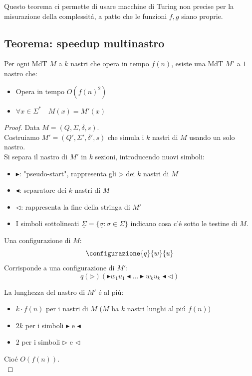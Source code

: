 Questo teorema ci permette di usare macchine di Turing non precise per la misurazione della complessitá, a patto che le funzioni $f, g$ siano proprie.


\subsection{Teorema: speedup multinastro}
Per ogni MdT $M$ a $k$ nastri che opera in tempo $f(n)$, esiste una MdT $M'$ a $1$ nastro che: 
\begin{itemize} 
	\item Opera in tempo $O(f(n)^2)$ 
	\item $\forall x \in \Sigma^* \quad M(x) = M'(x)$ 
\end{itemize}
\begin{proof}
Data $M = (Q, \Sigma, \delta, s)$. \\
Costruiamo $M' = (Q', \Sigma', \delta', s)$ che simula i $k$ nastri di $M$ usando un solo nastro. \\
Si separa il nastro di $M'$ in $k$ sezioni, introducendo nuovi simboli: 
\begin{itemize}
	\item $\blacktriangleright$: "pseudo-start", rappresenta gli $\triangleright$ dei $k$ nastri di $M$
	\item $\blacktriangleleft$: separatore dei $k$ nastri di $M$
	\item $\triangleleft$: rappresenta la fine della stringa di $M'$
	\item I simboli sottolineati $\underline{\Sigma} = \{\underline{\sigma} : \sigma \in \Sigma \}$ indicano cosa c'é sotto le testine di $M$.
\end{itemize}
{
Una configurazione di $M$:
\[
	\configurazione{q}{w}{u}
\] 
Corrisponde a una configurazione di $M'$:
\[
	q ({\triangleright}) (\blacktriangleright w_1 u_1 \blacktriangleleft \dots \blacktriangleright w_k u_k \blacktriangleleft \triangleleft )
\]
}
{
La lunghezza del nastro di $M'$ é al piú:
\begin{itemize}
	\item $k \cdot f(n)$ per i nastri di $M$ 
		\subitem ($M$ ha $k$ nastri lunghi al piú $f(n)$)
	\item $2k$ per i simboli $\blacktriangleright$ e $\blacktriangleleft$
	\item $2$ per i simboli $\triangleright$ e $\triangleleft$
\end{itemize}
Cioé $O(f(n))$. \\
}


\end{proof}
